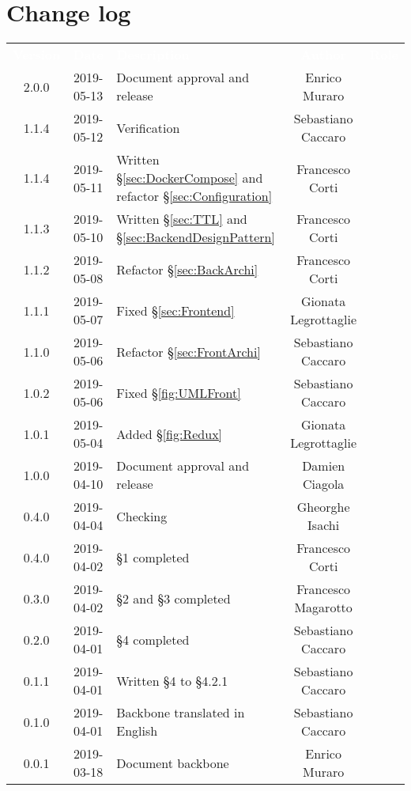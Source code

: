 \section*{Change log}
{
	\renewcommand{\arraystretch}{1.5}
	\centering
	\begin{longtable}{ c c C{6cm} c c }
		\textcolor{white}{\textbf{Version}} & \textcolor{white}{\textbf{Date}} & \textcolor{white}{\textbf{Description}} & \textcolor{white}{\textbf{Author}} & \textcolor{white}{\textbf{Role}}\\
		2.0.0 & 2019-05-13 & Document approval and release & Enrico Muraro & \RdP{}\\
		1.1.4 & 2019-05-12 & Verification & Sebastiano Caccaro & \ver{}\\
		1.1.4 & 2019-05-11 & Written §\ref{sec:DockerCompose} and refactor §\ref{sec:Configuration} & Francesco Corti & \reda{}\\
		1.1.3 & 2019-05-10 & Written §\ref{sec:TTL} and §\ref{sec:BackendDesignPattern} & Francesco Corti & \reda{}\\
		1.1.2 & 2019-05-08 & Refactor §\ref{sec:BackArchi}  & Francesco Corti & \reda{}\\
		1.1.1 & 2019-05-07 & Fixed §\ref{sec:Frontend} & Gionata Legrottaglie & \reda{}\\
		1.1.0 & 2019-05-06 & Refactor §\ref{sec:FrontArchi} & Sebastiano Caccaro & \reda{}\\
		1.0.2 & 2019-05-06 & Fixed §\ref{fig:UMLFront} & Sebastiano Caccaro & \reda{}\\
		1.0.1 & 2019-05-04 & Added §\ref{fig:Redux} & Gionata Legrottaglie & \reda{}\\
		1.0.0 & 2019-04-10 & Document approval and release & Damien Ciagola & \RdP{}\\
		0.4.0 & 2019-04-04 & Checking & Gheorghe Isachi & \ver{}\\
		0.4.0 & 2019-04-02 & §1 completed  & Francesco Corti & \reda{}\\		
		0.3.0 & 2019-04-02 & §2 and §3 completed  & Francesco Magarotto & \reda{}\\				
		0.2.0 & 2019-04-01 & §4 completed  & Sebastiano Caccaro & \reda{}\\
		0.1.1 & 2019-04-01 & Written §4 to §4.2.1  & Sebastiano Caccaro & \reda{}\\
		0.1.0 & 2019-04-01 & Backbone translated in English & Sebastiano Caccaro & \reda{}\\
		0.0.1 & 2019-03-18 & Document backbone & Enrico Muraro & \reda{}\\
		
	\end{longtable}

}

